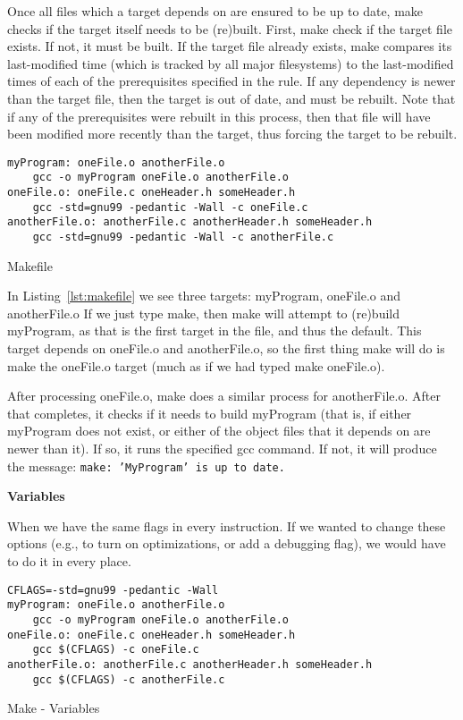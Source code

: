 \documentclass[11pt, a4paper]{article}
\begin{document}
Once all files which a target depends on are ensured to be up to date, make checks if the target itself needs to be (re)built. First, make check if the target file exists. If not, it must be built. If the target file already exists, make compares its last-modified time (which is tracked by all major filesystems) to the last-modified times of each of the prerequisites specified in the rule. If any dependency is newer than the target file, then the target is out of date, and must be rebuilt. Note that if any of the prerequisites were rebuilt in this process, then that file will have been modified more recently than the target, thus forcing the target to be rebuilt.


\begin{listing}
\begin{verbatim}
myProgram: oneFile.o anotherFile.o
    gcc -o myProgram oneFile.o anotherFile.o
oneFile.o: oneFile.c oneHeader.h someHeader.h
    gcc -std=gnu99 -pedantic -Wall -c oneFile.c
anotherFile.o: anotherFile.c anotherHeader.h someHeader.h
    gcc -std=gnu99 -pedantic -Wall -c anotherFile.c
\end{verbatim}
\caption{Makefile}
\label{lst:makefile}
\end{listing}

In Listing~\ref{lst:makefile} we see three targets: myProgram, oneFile.o and anotherFile.o 
If we just type make, then make will attempt to (re)build myProgram, as that is the first target in the file, and thus the default. This target depends on oneFile.o and anotherFile.o, so the first thing make will do is make the oneFile.o target (much as if we had typed make oneFile.o).



After processing oneFile.o, make does a similar process for anotherFile.o. After that completes, it checks if it needs to build myProgram (that is, if either myProgram does not exist, or either of the object files that it depends on are newer than it). If so, it runs the specified gcc command. If not, it will produce the message: \texttt{make: 'MyProgram' is up to date.} 


\textbf{Variables}

When we have the same flags in every instruction. If we wanted to change these options (e.g., to turn on optimizations, or add a debugging flag), we would have to do it in every place.


\begin{listing}
\begin{verbatim}
CFLAGS=-std=gnu99 -pedantic -Wall
myProgram: oneFile.o anotherFile.o
    gcc -o myProgram oneFile.o anotherFile.o
oneFile.o: oneFile.c oneHeader.h someHeader.h
    gcc $(CFLAGS) -c oneFile.c
anotherFile.o: anotherFile.c anotherHeader.h someHeader.h
    gcc $(CFLAGS) -c anotherFile.c
\end{verbatim}
\caption{Make - Variables}
\label{lst:make_variables}
\end{listing}
\end{document}
